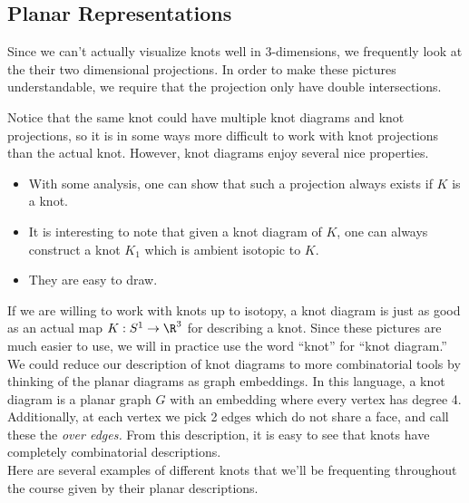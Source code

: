 \subsection{Planar Representations}

Since we can't actually visualize knots well in 3-dimensions, we frequently look at the their two dimensional projections. In order to make these pictures understandable, we require that the projection only have double intersections.\\

Notice that the same knot could have multiple knot diagrams and knot projections, so it is in some ways more difficult to work with knot projections than the actual knot. However, knot diagrams enjoy several nice properties.
\begin{itemize}
\item With some analysis, one can show that such a projection always exists if $K$ is a knot. 
\item It is interesting to note that given a knot diagram of $K$, one can always construct a knot $K_1$ which is ambient isotopic to $K$. 
\item They are easy to draw.
\end{itemize}
If we are willing to work with knots up to isotopy, a knot diagram is just as good as an actual map $K: S^1\to \R^3$ for describing a knot. Since these pictures are much easier to use, we will in practice use the word ``knot'' for ``knot diagram.'' 
We could reduce our description of knot diagrams to more combinatorial tools by thinking of the planar diagrams as graph embeddings. In this language, a knot diagram is a planar graph $G$ with an embedding where every vertex has degree 4. Additionally, at each vertex we pick 2 edges which do not share a face, and call these the \emph{over edges.} From this description, it is easy to see that knots have completely combinatorial descriptions. \\
Here are several examples of different knots that we'll be frequenting throughout the course given by their planar descriptions.\\ 

